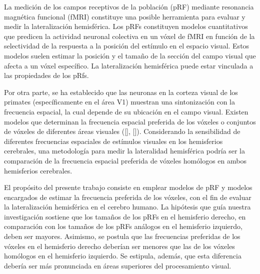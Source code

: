 

La medición de los campos receptivos de la población (pRF)  mediante resonancia magnética funcional (fMRI) constituye una posible herramienta para evaluar y medir la lateralización hemisférica. Los pRFs constituyen modelos cuantitativos que predicen la actividad neuronal colectiva en un vóxel de fMRI en función de la selectividad de la respuesta a la posición del estímulo en el espacio visual. Estos modelos suelen estimar la posición y el tamaño de la sección del campo visual que afecta a un vóxel específico. La lateralización hemisférica puede estar vinculada a las propiedades de los pRfs.

Por otra parte, se ha establecido que las neuronas en la corteza visual de los primates (específicamente en el área V1) muestran una sintonización con la frecuencia espacial, la cual depende de su ubicación en el campo visual. Existen modelos que determinan la frecuencia espacial preferida de los vóxeles o conjuntos de v\'oxeles de diferentes áreas visuales ([\cite{aghajari_population_2020}], [\cite{broderick_mapping_2022}]). Considerando la sensibilidad de diferentes frecuencias espaciales de est\'imulos visuales en los hemisferios cerebrales, una metodología para medir la lateralidad hemisférica podría ser la comparación de la frecuencia espacial preferida de vóxeles homólogos en ambos hemisferios cerebrales. 

El propósito del presente trabajo consiste en emplear modelos de pRF y modelos encargados de estimar la frecuencia preferida de los v\'oxeles, con el fin de evaluar la lateralización hemisférica en el cerebro humano. La hipótesis que guía nuestra investigación sostiene que los tamaños de los pRFs en el hemisferio derecho, en comparación con los tamaños de los pRFs an\'alogos en el hemisferio izquierdo, deben ser mayores. Asimismo, se postula que las frecuencias preferidas de los v\'oxeles en el hemisferio derecho deberían ser menores que las de los v\'oxeles homólogos en el hemisferio izquierdo. Se estipula, además, que esta diferencia debería ser más pronunciada en áreas superiores del procesamiento visual.

